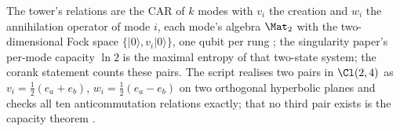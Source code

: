 The tower's relations \cite[Prop.~4.1]{ButlerT3} are the CAR of $k$ modes with $v_i$ the creation and $w_i$ the annihilation operator of mode $i$, each mode's algebra $\Mat_2$ with the two-dimensional Fock space $\{|0\rangle, v_i|0\rangle\}$, one qubit per rung \cite[Thm.~4.2]{ButlerT3}; the singularity paper's per-mode capacity $\ln 2$ is the maximal entropy of that two-state system; the corank statement counts these pairs. The script realises two pairs in $\Cl(2,4)$ as $v_i = \tfrac12(e_a + e_b)$, $w_i = \tfrac12(e_a - e_b)$ on two orthogonal hyperbolic planes and checks all ten anticommutation relations exactly; that no third pair exists is the capacity theorem \cite[Thm.~4.3]{ButlerT3}.
